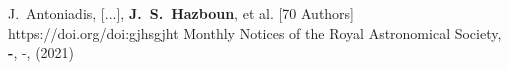          {J.~{Antoniadis}, [...], \textbf{J.~S.~{Hazboun}}, et al. [70 Authors]}
         {https://doi.org/doi:gjhsgjht}
         {{Monthly Notices of the Royal Astronomical Society}, \textbf{-}, -, (2021)}

